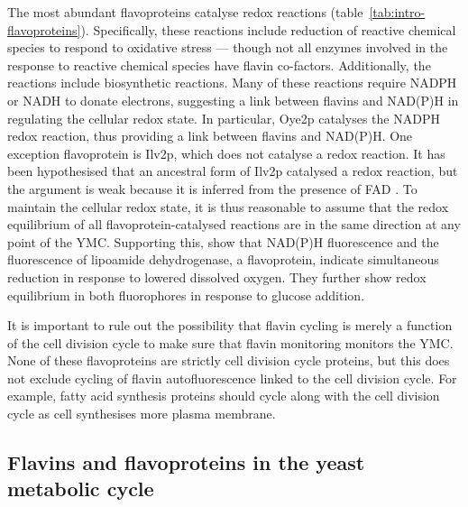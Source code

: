 The most abundant flavoproteins catalyse redox reactions (table~\ref{tab:intro-flavoproteins}).
Specifically, these reactions include reduction of reactive chemical species to respond to oxidative stress --- though not all enzymes involved in the response to reactive chemical species have flavin co-factors.
Additionally, the reactions include biosynthetic reactions.
Many of these reactions require NADPH or NADH to donate electrons, suggesting a link between flavins and NAD(P)H in regulating the cellular redox state.
In particular, Oye2p catalyses the NADPH redox reaction, thus providing a link between flavins and NAD(P)H.
One exception flavoprotein is Ilv2p, which does not catalyse a redox reaction.
It has been hypothesised that an ancestral form of Ilv2p catalysed a redox reaction, but the argument is weak because it is inferred from the presence of FAD \citep{pangCrystalStructureYeast2002}.
To maintain the cellular redox state, it is thus reasonable to assume that the redox equilibrium of all flavoprotein-catalysed reactions are in the same direction at any point of the YMC.
Supporting this, \citet{sianoNADHFlavinFluorescence1989} show that NAD(P)H fluorescence and the fluorescence of lipoamide dehydrogenase, a flavoprotein, indicate simultaneous reduction in response to lowered dissolved oxygen.
They further show redox equilibrium in both fluorophores in response to glucose addition.

It is important to rule out the possibility that flavin cycling is merely a function of the cell division cycle to make sure that flavin monitoring monitors the YMC.
None of these flavoproteins are strictly cell division cycle proteins, but this does not exclude cycling of flavin autofluorescence linked to the cell division cycle.
For example, fatty acid synthesis proteins should cycle along with the cell division cycle as cell synthesises more plasma membrane.

\subsection{Flavins and flavoproteins in the yeast metabolic cycle}
\label{subsec:intro-flavin-ymc}


